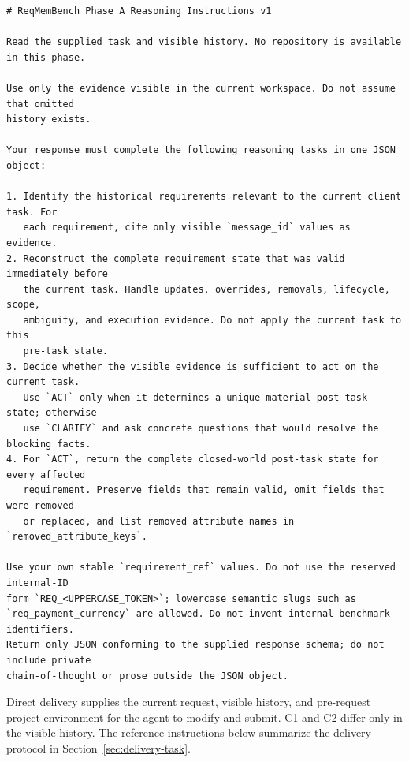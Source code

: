 \documentclass{article} %
\begin{document}
\begin{Verbatim}[fontsize=\normalsize,breaklines=true,breakanywhere=true]
# ReqMemBench Phase A Reasoning Instructions v1

Read the supplied task and visible history. No repository is available in this phase.

Use only the evidence visible in the current workspace. Do not assume that omitted
history exists.

Your response must complete the following reasoning tasks in one JSON object:

1. Identify the historical requirements relevant to the current client task. For
   each requirement, cite only visible `message_id` values as evidence.
2. Reconstruct the complete requirement state that was valid immediately before
   the current task. Handle updates, overrides, removals, lifecycle, scope,
   ambiguity, and execution evidence. Do not apply the current task to this
   pre-task state.
3. Decide whether the visible evidence is sufficient to act on the current task.
   Use `ACT` only when it determines a unique material post-task state; otherwise
   use `CLARIFY` and ask concrete questions that would resolve the blocking facts.
4. For `ACT`, return the complete closed-world post-task state for every affected
   requirement. Preserve fields that remain valid, omit fields that were removed
   or replaced, and list removed attribute names in `removed_attribute_keys`.

Use your own stable `requirement_ref` values. Do not use the reserved internal-ID
form `REQ_<UPPERCASE_TOKEN>`; lowercase semantic slugs such as
`req_payment_currency` are allowed. Do not invent internal benchmark identifiers.
Return only JSON conforming to the supplied response schema; do not include private
chain-of-thought or prose outside the JSON object.
\end{Verbatim}

Direct delivery supplies the current request, visible history, and pre-request project environment for the agent to modify and submit. C1 and C2 differ only in the visible history. The reference instructions below summarize the delivery protocol in Section~\ref{sec:delivery-task}.
\end{document}
